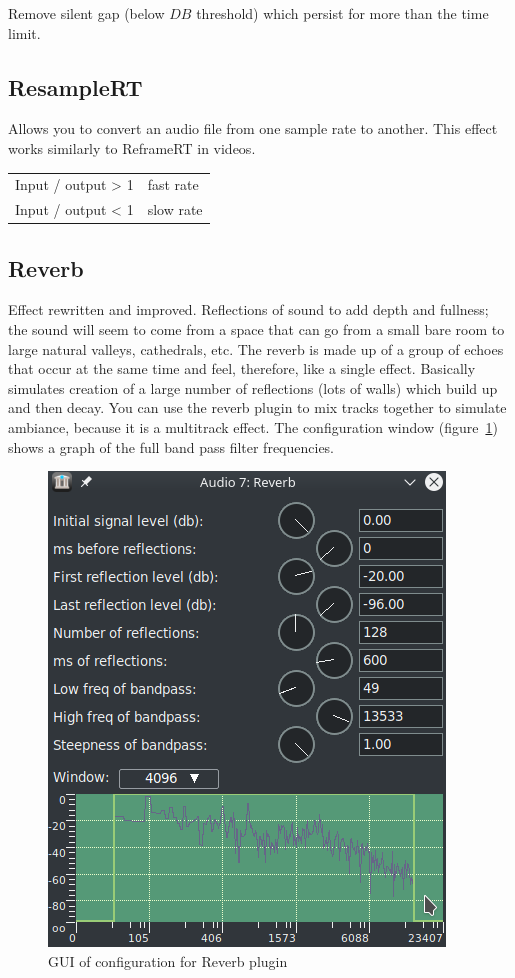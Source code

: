 Remove silent gap (below $DB$ threshold) which persist for more than the time limit.

\subsection{ResampleRT}%
\label{sub:resamplert}

Allows you to convert an audio file from one sample rate to another. This effect works similarly to ReframeRT in videos.

\begin{center}
    \begin{tabular}{l l}
        \toprule
        Input / output > 1 &	fast rate \\
        Input / output < 1 &	slow rate \\        
        \bottomrule
    \end{tabular}
\end{center}

\subsection{Reverb}%
\label{sub:reverb}

Effect rewritten and improved.
Reflections of sound to add depth and fullness; the sound will seem to come from a space that can go from a small bare room to large natural valleys, cathedrals, etc. The reverb is made up of a group of echoes that occur at the same time and feel, therefore, like a single effect. Basically simulates creation of a large number of reflections (lots of walls) which build up and then decay. You can use the reverb plugin to mix tracks together to simulate ambiance, because it is a multitrack effect.
The configuration window (figure~\ref{fig:reverb}) shows a graph of the full band pass filter frequencies.

\begin{figure}[htpb]
	\centering
	\includegraphics[width=0.5\linewidth]{images/reverb.png}
	\caption{GUI of configuration for Reverb plugin}
	\label{fig:reverb}
\end{figure}


